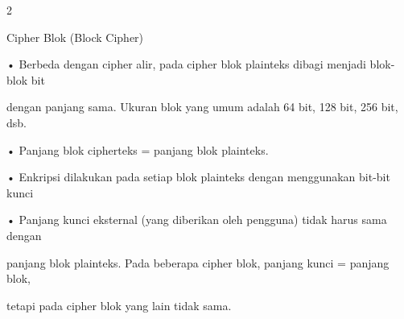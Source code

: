 \documentclass{article}
\begin{document}

2

Cipher Blok (Block Cipher)

• Berbeda dengan cipher alir, pada cipher blok plainteks dibagi menjadi blok-blok bit 

dengan panjang sama. Ukuran blok yang umum adalah 64 bit, 128 bit,  256 bit, dsb.

• Panjang blok cipherteks = panjang blok plainteks.

• Enkripsi dilakukan pada setiap blok plainteks dengan menggunakan bit-bit kunci 

• Panjang kunci eksternal (yang diberikan oleh pengguna) tidak harus sama dengan 

panjang blok plainteks. Pada beberapa cipher blok, panjang kunci = panjang blok, 

tetapi pada cipher blok yang lain tidak sama.
\end{document}
